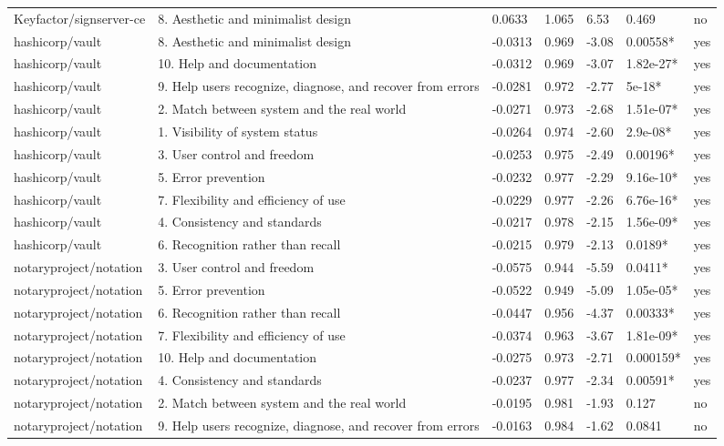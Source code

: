 \begin{table}[t]
\begin{tabular}{lllllll}
Keyfactor/signserver-ce & 8. Aesthetic and minimalist design & 0.0633 & 1.065 & 6.53 & 0.469 & no \\
hashicorp/vault & 8. Aesthetic and minimalist design & -0.0313 & 0.969 & -3.08 & 0.00558* & yes \\
hashicorp/vault & 10. Help and documentation & -0.0312 & 0.969 & -3.07 & 1.82e-27* & yes \\
hashicorp/vault & 9. Help users recognize, diagnose, and recover from errors & -0.0281 & 0.972 & -2.77 & 5e-18* & yes \\
hashicorp/vault & 2. Match between system and the real world & -0.0271 & 0.973 & -2.68 & 1.51e-07* & yes \\
hashicorp/vault & 1. Visibility of system status & -0.0264 & 0.974 & -2.60 & 2.9e-08* & yes \\
hashicorp/vault & 3. User control and freedom & -0.0253 & 0.975 & -2.49 & 0.00196* & yes \\
hashicorp/vault & 5. Error prevention & -0.0232 & 0.977 & -2.29 & 9.16e-10* & yes \\
hashicorp/vault & 7. Flexibility and efficiency of use & -0.0229 & 0.977 & -2.26 & 6.76e-16* & yes \\
hashicorp/vault & 4. Consistency and standards & -0.0217 & 0.978 & -2.15 & 1.56e-09* & yes \\
hashicorp/vault & 6. Recognition rather than recall & -0.0215 & 0.979 & -2.13 & 0.0189* & yes \\
notaryproject/notation & 3. User control and freedom & -0.0575 & 0.944 & -5.59 & 0.0411* & yes \\
notaryproject/notation & 5. Error prevention & -0.0522 & 0.949 & -5.09 & 1.05e-05* & yes \\
notaryproject/notation & 6. Recognition rather than recall & -0.0447 & 0.956 & -4.37 & 0.00333* & yes \\
notaryproject/notation & 7. Flexibility and efficiency of use & -0.0374 & 0.963 & -3.67 & 1.81e-09* & yes \\
notaryproject/notation & 10. Help and documentation & -0.0275 & 0.973 & -2.71 & 0.000159* & yes \\
notaryproject/notation & 4. Consistency and standards & -0.0237 & 0.977 & -2.34 & 0.00591* & yes \\
notaryproject/notation & 2. Match between system and the real world & -0.0195 & 0.981 & -1.93 & 0.127 & no \\
notaryproject/notation & 9. Help users recognize, diagnose, and recover from errors & -0.0163 & 0.984 & -1.62 & 0.0841 & no \\

\end{tabular}
\end{table}
